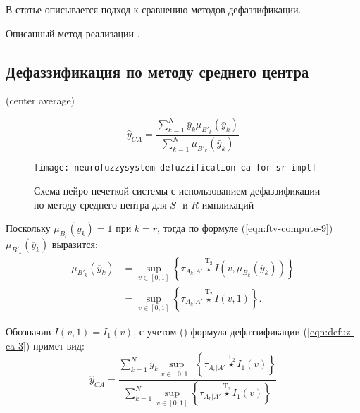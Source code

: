 В статье \cite{VanLeekwijck1999} описывается подход к сравнению методов дефаззификации.

Описанный метод реализации \cite{eisele1994}.

\subsection{Дефаззификация по методу среднего центра}

(center average)

\begin{equation*}
	\label{eqn:defuz-ca-1}
	\hat{y}_{CA} = \frac{\sum_{k=1}^{N} \bar{y}_k \mu_{B'_k}(\bar{y}_k)}{\sum_{k=1}^{N} \mu_{B'_k}(\bar{y}_k)}
\end{equation*}

\begin{figure}[ht]
	\centering
	\texttt{[image: neurofuzzysystem-defuzzification-ca-for-sr-impl]}
	\caption{Схема нейро-нечеткой системы с использованием дефаззификации по методу среднего центра для $S$- и $R$-импликаций}
	\label{fig:neurofuzzysystem-defuzzification-ca-for-sr-impl}
\end{figure}

Поскольку $\mu_{B_r}(\overline{y}_k) = 1$ при $k = r$, тогда по формуле (\ref{eqn:ftv-compute-9}) $\mu_{B'_k}(\overline{y}_k)$ выразится:
\begin{align}
	\label{eqn:defuz-ca-3}
	\mu_{B'_k}(\overline{y}_k) &= \sup_{v\in [0, 1]} \left\{\tau_{A_k|A'}\overset{\mathrm{T}_2}{\star} I\left(v, \mu_{B_k}(\overline{y}_k)\right)\right\}\\ &= \sup_{v\in [0, 1]} \left\{\tau_{A_k|A'}\overset{\mathrm{T}_2}{\star} I\left(v, 1\right)\right\}.
\end{align}

Обозначив $I(v, 1) = I_1(v)$, с учетом () формула дефаззификации (\ref{eqn:defuz-ca-3}) примет вид:
\begin{equation}
	\label{eqn:defuz-ca-4}
	\hat{y}_{CA} = \frac{\sum_{k=1}^{N} \bar{y}_k \sup_{v\in [0, 1]} \left\{\tau_{A_r|A'}\overset{\mathrm{T}_2}{\star} I_1(v) \right\}}{\sum_{k=1}^{N} \sup_{v\in [0, 1]} \left\{\tau_{A_r|A'}\overset{\mathrm{T}_2}{\star} I_1(v) \right\}}
\end{equation}

